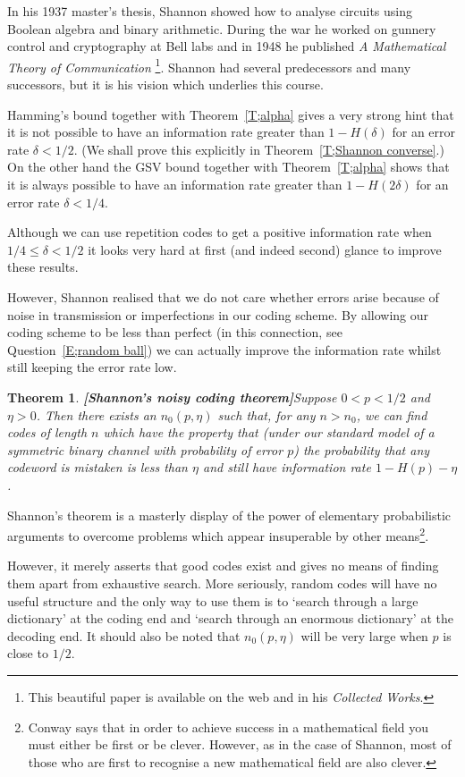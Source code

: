 \documentclass[12pt,a4paper]{article}
\theoremstyle{plain}
\newtheorem{theorem}{Theorem}[section]
\theoremstyle{definition}
\begin{document}
In his 1937 master's thesis, Shannon showed how to
analyse circuits using Boolean algebra and binary arithmetic.
During the war he worked on gunnery control
and cryptography at Bell labs and in 1948 he published
\emph{A Mathematical Theory of Communication}%
\footnote{This beautiful paper is available on the web
and in his \emph{Collected Works}.}.
Shannon had several predecessors and many successors,
but it is his vision which underlies this course.

Hamming's bound together with
Theorem~\ref{T;alpha} 
gives a very strong hint that it is not possible to
have an information rate greater than 
$1-H(\delta)$ for an error rate $\delta<1/2$.
(We shall prove this explicitly in Theorem~\ref{T;Shannon converse}.)
On the other hand  the GSV bound
together with
Theorem~\ref{T;alpha} 
shows that it is always possible to
have an information rate greater than 
$1-H(2\delta)$ for an error rate $\delta<1/4$.

Although we can use repetition codes
to get a positive information rate
when $1/4\leq \delta<1/2$ it looks
very hard at first (and indeed second) glance
to improve these results. 

However, Shannon realised that 
we do not care whether errors arise because
of noise in transmission or imperfections
in our coding scheme. By allowing our coding 
scheme to be less than perfect 
(in this connection, see Question~\ref{E;random ball})
we can 
actually improve the information rate whilst
still keeping the error rate low.
\begin{theorem}{\bf [Shannon's noisy coding theorem]}\label{T;Shannon}
Suppose $0<p<1/2$ and $\eta>0$.
Then there exists an $n_{0}(p,\eta)$ such that,
for any $n>n_{0}$, we can find codes of
length $n$ which have the property
that (under our standard model
of  a symmetric binary
channel with probability of error $p$) the probability
that any codeword is mistaken is less than
$\eta$ and still have
information rate $1-H(p)-\eta$.
\end{theorem}
Shannon's theorem is a masterly display
of the power of elementary probabilistic
arguments to overcome problems
which appear insuperable by other 
means\footnote{Conway says that in order to
achieve success in a mathematical field
you must either be first or be clever.
However, as in the case of Shannon,
most of those who are first
to recognise a new mathematical field
are also clever.}.

However, it merely asserts that good codes
exist and gives no means of finding
them apart from exhaustive search.
More seriously, random codes will have
no useful structure and the only way to use them
is to `search through a large dictionary'
at the coding end and
`search through an enormous dictionary'
at the decoding end. 
It should also be noted that  $n_{0}(p,\eta)$
will be very large when $p$ is close to $1/2$.
\end{document}
